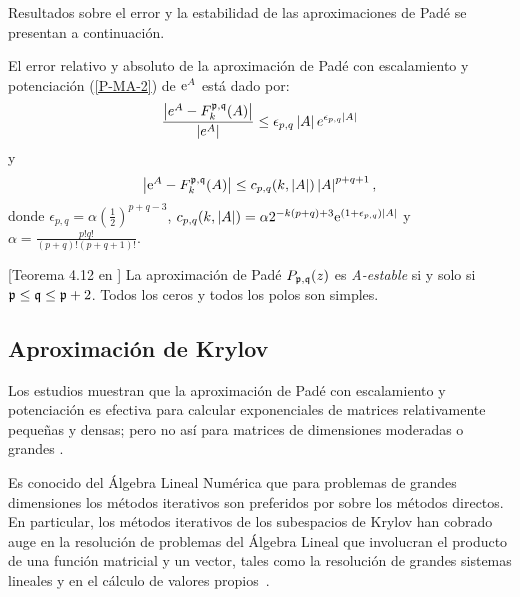 Resultados sobre el error y la estabilidad de las aproximaciones de Padé se presentan a continuación.

\begin{theorem}
    \label{Conv. Pade}\cite{jimenez2012convergence} El error
    relativo y absoluto de la aproximación de Padé con escalamiento y
    potenciación (\ref{P-MA-2}) de $\mathrm{e}^{A}$ está dado por: 
    \[
    \frac{\left\vert e^{A}-F_{k}^{\mathfrak{p},\mathfrak{q}}(A)\right\vert 
    }{\left\vert e^{A}\right\vert }\leq \epsilon _{p,q}\left\vert 
    A\right\vert e^{\epsilon _{p,q}\left\vert A\right\vert }
    \]%
    y 
    \begin{equation}
    \left\vert \mathrm{e}^{A}-F_{k}^{\mathfrak{p},\mathfrak{q}}(A)\right\vert \leq
    c_{p,q}(k,\left\vert A\right\vert )\left\vert A\right\vert
    ^{p+q+1}, \label{errpade}
    \end{equation}
    donde $\epsilon _{p,q}=\alpha (\frac{1}{2})^{p+q-3}$, $%
    c_{p,q}(k,\left\vert A\right\vert )=\alpha
    2^{-k(p+q)+3}\me{(1+\epsilon _{p,q})\left\vert A\right\vert }$ y $%
    \alpha =\frac{p!q!}{(p+q)!(p+q+1)!}$.
\end{theorem}

\begin{theorem}\label{Stab. Pade}[Teorema 4.12 en \cite{wanner1996solving}] 
    La aproximación de Padé $P_{\mathfrak{p},\mathfrak{q}}(z)$  es \emph{A-estable} si y solo si $\mathfrak{p}\leq \mathfrak{q}\leq \mathfrak{p}+2$. 
    Todos los ceros y todos los polos son simples.
\end{theorem}

\subsection{Aproximación de Krylov}

Los estudios muestran que la aproximación de Padé con escalamiento y potenciación
es efectiva para calcular exponenciales de matrices relativamente pequeñas y densas; pero no así para matrices de dimensiones moderadas o grandes \cite{moler2003nineteen}.

Es conocido del Álgebra Lineal Numérica que para problemas de
grandes dimensiones los métodos iterativos son preferidos por sobre los métodos directos.
En particular,
los métodos iterativos de los subespacios de Krylov han cobrado auge en la resolución de
problemas del Álgebra Lineal que involucran el producto de una función matricial y un vector,
tales como la resolución de grandes sistemas lineales y en el cálculo de valores
propios~\cite{golub2013matrix}.

